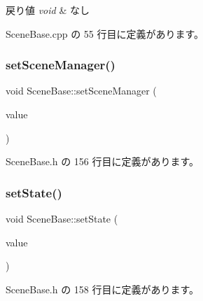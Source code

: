 \begin{DoxyRetVals}{戻り値}
{\em void} & なし \\
\hline
\end{DoxyRetVals}


 Scene\+Base.\+cpp の 55 行目に定義があります。

\mbox{\label{class_scene_base_aae1930cae97c27ee7d54b4bd8896a515}} 
\subsubsection{\texorpdfstring{set\+Scene\+Manager()}{setSceneManager()}}
{\footnotesize\ttfamily void Scene\+Base\+::set\+Scene\+Manager (\begin{DoxyParamCaption}\item[{\mbox{\hyperlink{class_scene_manager}{Scene\+Manager}} $\ast$}]{value }\end{DoxyParamCaption})\hspace{0.3cm}{\ttfamily [inline]}}



 Scene\+Base.\+h の 156 行目に定義があります。

\mbox{\label{class_scene_base_a95d33774db6a05cf1e9da201720ea3db}} 
\subsubsection{\texorpdfstring{set\+State()}{setState()}}
{\footnotesize\ttfamily void Scene\+Base\+::set\+State (\begin{DoxyParamCaption}\item[{\mbox{\hyperlink{class_scene_base_1_1_state_base}{State\+Base}} $\ast$}]{value }\end{DoxyParamCaption})\hspace{0.3cm}{\ttfamily [inline]}}



 Scene\+Base.\+h の 158 行目に定義があります。

\mbox{\label{class_scene_base_aa4babf42cf2c2b6e17bb3ddd6ff13d31}} 
